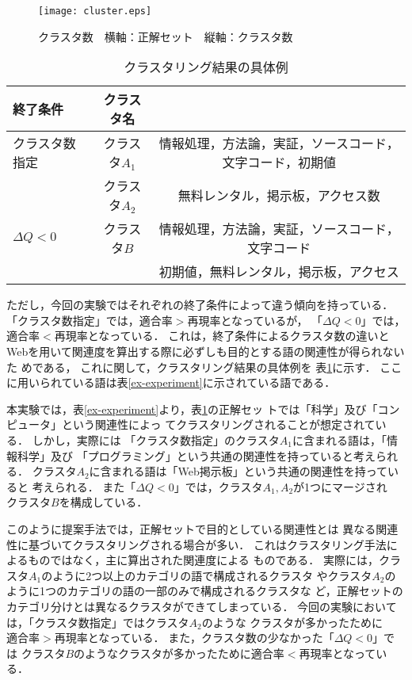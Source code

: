 \documentclass[japanese]{jnlp_1.3a}
\begin{document}
\begin{figure}[b]
 \begin{center}
  \texttt{[image: cluster.eps]}
 \end{center}
 \caption{クラスタ数　横軸：正解セット　縦軸：クラスタ数}
  \label{cluster-num}
\end{figure}
\begin{table}[b]
\caption{クラスタリング結果の具体例}
\label{cluster-example}
\begin{center}
\begin{tabular}{l|c|c}
終了条件 & クラスタ名   &  \\ \hline
クラスタ数指定 & クラスタ$A_1$ & 情報処理，方法論，実証，ソースコード，文字コード，初期値 \\ 
\cline{2-3}
              & クラスタ$A_2$ & 無料レンタル，掲示板，アクセス数 \\ \hline
$\Delta Q<0$ & クラスタ$B$ & 情報処理，方法論，実証，ソースコード，文字コード \\ 
 & &  初期値，無料レンタル，掲示板，アクセス \\ \hline
\end{tabular}
\end{center}
\end{table}



ただし，今回の実験ではそれぞれの終了条件によって違う傾向を持っている．
「クラスタ数指定」では，$適合率 > 再現率$となっているが，
「$\Delta Q<0$」では，$適合率 < 再現率$となっている．
これは，終了条件によるクラスタ数の違いと
Webを用いて関連度を算出する際に必ずしも目的とする語の関連性が得られないた
めである，
これに関して，クラスタリング結果の具体例を
表\ref{cluster-example}に示す．
ここに用いられている語は表\ref{ex-experiment}に示されている語である．

本実験では，表\ref{ex-experiment}より，表\ref{cluster-example}の正解セッ
トでは「科学」及び「コンピュータ」という関連性によっ
てクラスタリングされることが想定されている．
しかし，実際には
「クラスタ数指定」のクラスタ$A_1$に含まれる語は，「情報科学」及び
「プログラミング」という共通の関連性を持っていると考えられる．
クラスタ$A_2$に含まれる語は「Web掲示板」という共通の関連性を持っていると
考えられる．
また「$\Delta Q<0$」では，クラスタ$A_1, A_2$が1つにマージされ
$クラスタB$を構成している．

このように提案手法では，正解セットで目的としている関連性とは
異なる関連性に基づいてクラスタリングされる場合が多い．
これはクラスタリング手法によるものではなく，主に算出された関連度による
ものである．
実際には，クラスタ$A_1$のように2つ以上のカテゴリの語で構成されるクラスタ
やクラスタ$A_2$のように1つのカテゴリの語の一部のみで構成されるクラスタな
ど，正解セットのカテゴリ分けとは異なるクラスタができてしまっている．
今回の実験においては，「クラスタ数指定」ではクラスタ$A_2$のような
クラスタが多かったために$適合率 > 再現率$となっている．
また，クラスタ数の少なかった「$\Delta Q <0$」では
クラスタ$B$のようなクラスタが多かったために$適合率 < 再現率$となっている．
\end{document}

